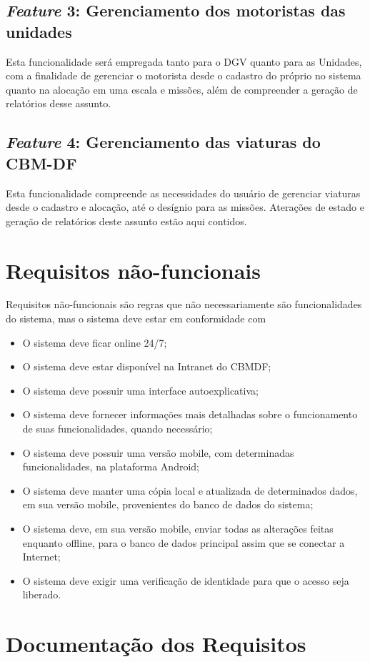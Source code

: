 \begin{apendicesenv}
		\subsection{\textit{Feature} 3: Gerenciamento dos motoristas das unidades}
Esta funcionalidade será empregada tanto para o DGV quanto para as Unidades, com a finalidade de gerenciar o motorista desde o cadastro do próprio no sistema quanto na alocação em uma escala e missões, além de compreender a geração de relatórios desse assunto.
		\subsection{\textit{Feature} 4: Gerenciamento das viaturas do CBM-DF}
Esta funcionalidade compreende as necessidades do usuário de gerenciar viaturas desde o cadastro e alocação, até o desígnio para as missões. Aterações de estado e geração de relatórios deste assunto estão aqui contidos.
	\section{Requisitos não-funcionais}		
Requisitos não-funcionais são regras que não necessariamente são funcionalidades do sistema, mas o sistema deve estar em conformidade com 
\begin{itemize}
 \item O sistema deve ficar online 24/7;
 \item O sistema deve estar disponível na Intranet do CBMDF;
 \item O sistema deve possuir uma interface autoexplicativa;
 \item O sistema deve fornecer informações mais detalhadas sobre o funcionamento de suas funcionalidades, quando necessário;
 \item O sistema deve possuir uma versão mobile, com determinadas funcionalidades, na plataforma Android;
 \item O sistema deve manter uma cópia local e atualizada de determinados dados, em sua versão mobile, provenientes do banco de dados do sistema;
 \item O sistema deve, em sua versão mobile, enviar todas as alterações feitas enquanto offline, para o banco de dados principal assim que se conectar a Internet;
 \item O sistema deve exigir uma verificação de identidade para que o acesso seja liberado.
\end{itemize}
	\section{Documentação dos Requisitos}

\end{apendicesenv}
